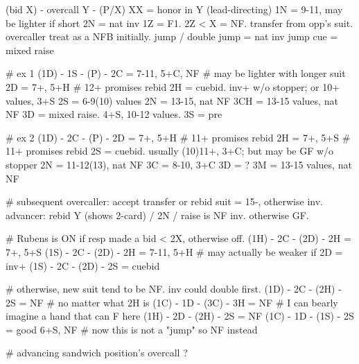 (bid X) - overcall Y - (P/X)
XX = honor in Y (lead-directing)
1N = 9-11, may be lighter if short
2N = nat inv
1Z = F1. 2Z < X = NF.
transfer from opp's suit. overcaller treat as a NFB initially.
jump / double jump = nat inv
jump cue = mixed raise

# ex 1
(1D) - 1S - (P) - 
2C = 7-11, 5+C, NF  # may be lighter with longer suit
2D = 7+, 5+H  # 12+ promises rebid
2H = cuebid. inv+ w/o stopper; or 10+ values, 3+S
2S = 6-9(10) values
2N = 13-15, nat NF
3CH = 13-15 values, nat NF
3D = mixed raise. 4+S, 10-12 values.
3S = pre

# ex 2
(1D) - 2C - (P) -
2D = 7+, 5+H  # 11+ promises rebid
2H = 7+, 5+S  # 11+ promises rebid
2S = cuebid. usually (10)11+, 3+C; but may be GF w/o stopper 
2N = 11-12(13), nat NF
3C = 8-10, 3+C
3D = ?
3M = 13-15 values, nat NF

# subsequent
overcaller: accept transfer or rebid suit = 15-, otherwise inv.
advancer: rebid Y (shows 2-card) / 2N / raise is NF inv. otherwise GF.

# Rubens is ON if resp made a bid < 2X, otherwise off.
(1H) - 2C - (2D) - 2H = 7+, 5+S
(1S) - 2C - (2D) - 2H = 7-11, 5+H  # may actually be weaker if 2D = inv+
(1S) - 2C - (2D) - 2S = cuebid

# otherwise, new suit tend to be NF. inv could double first.
(1D) - 2C - (2H) - 2S = NF  # no matter what 2H is
(1C) - 1D - (3C) - 3H = NF  # I can bearly imagine a hand that can F here
(1H) - 2D - (2H) - 2S = NF
(1C) - 1D - (1S) - 2S = good 6+S, NF  # now this is not a "jump" so NF instead

# advancing sandwich position's overcall ?